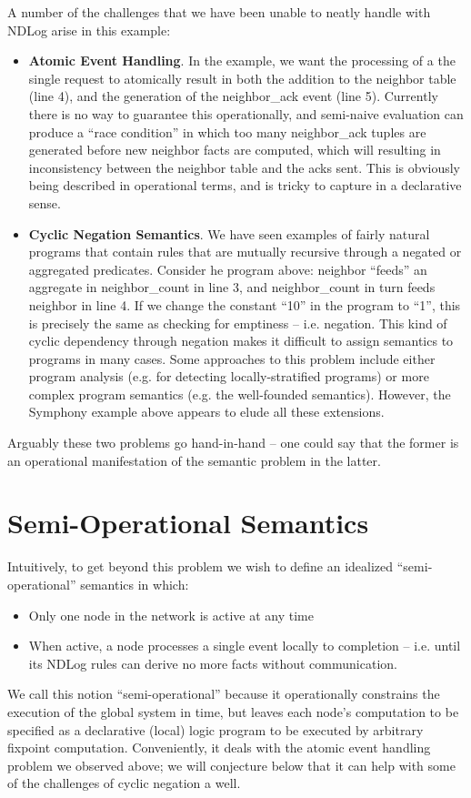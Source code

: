 \documentclass{article}
\begin{document}
A number of the challenges that we have been unable to neatly handle with
NDLog arise in this example:
\begin{itemize}
\item {\bf Atomic Event Handling}.  In the example, we want the
  processing of a the single request to atomically result in both the
  addition to the neighbor table (line 4), and the generation of the
  neighbor\_ack event (line 5).  Currently there is no way to
  guarantee this operationally, and semi-naive evaluation can produce
  a ``race condition'' in which too many neighbor\_ack tuples are
  generated before new neighbor facts are computed, which will
  resulting in inconsistency between the neighbor table and the acks
  sent.  This is obviously being described in operational terms, and
  is tricky to capture in a declarative sense.
\item {\bf Cyclic Negation Semantics}.  We have seen examples of
  fairly natural programs that contain rules that are mutually
  recursive through a negated or aggregated predicates.  Consider he
  program above: neighbor ``feeds'' an aggregate in neighbor\_count in
  line 3, and neighbor\_count in turn feeds neighbor in line 4.  If we
  change the constant ``10'' in the program to ``1'', this is
  precisely the same as checking for emptiness -- i.e. negation.  This
  kind of cyclic dependency through negation makes it difficult to
  assign semantics to programs in many cases.  Some approaches to this
  problem include either program analysis (e.g. for detecting
  locally-stratified programs) or more complex program semantics (e.g.
  the well-founded semantics).  However, the Symphony example above
  appears to elude all these extensions.
\end{itemize}
Arguably these two problems go hand-in-hand -- one could say that the
former is an operational manifestation of the semantic problem in the latter.

\section{Semi-Operational Semantics} 
Intuitively, to get beyond this problem we wish to define an idealized
``semi-operational'' semantics in which:
\begin{itemize}
\item Only one node in the network is active at any time
\item When active, a node processes a single event locally to
  completion -- i.e. until its NDLog rules can derive no more facts
  without communication.
\end{itemize}
We call this notion ``semi-operational'' because it operationally
constrains the execution of the global system in time, but leaves each
node's computation to be specified as a declarative (local) logic
program to be executed by arbitrary fixpoint computation.
Conveniently, it deals with the atomic event handling problem we
observed above; we will conjecture below that it can help with some of
the challenges of cyclic negation a well.
\end{document}
